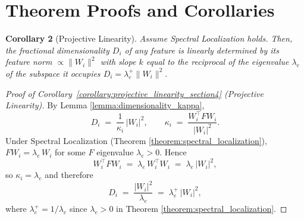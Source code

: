 \documentclass{article}
\theoremstyle{plain}
\numberwithin{equation}{section}
\theoremstyle{definition}
\theoremstyle{remark}
\begin{document}
\section{Theorem Proofs and Corollaries}
\label{sec:theorems_proofs_corollaries}

\begin{lemmaproofbox}
\textbf{Corollary 2} (Projective Linearity). \textit{Assume Spectral Localization holds. Then, the fractional dimensionality $D_i$ of any feature is linearly determined by its feature norm $\propto \|W_i\|^2$ with slope $k$ equal to the reciprocal of the eigenvalue $\lambda_e$ of the subspace it occupies $D_i = \lambda_e^+ \|W_i\|^2$}.
\begin{proof}[Proof of Corollary~\ref{corollary:projective_linearity_section4} (Projective Linearity)]\label{corollary:projective_linearity}
By Lemma \ref{lemma:dimensionality_kappa},
\[
D_i \;=\; \frac{1}{\kappa_i}\,\lvert W_i\rvert^2,
\qquad
\kappa_i \;=\; \frac{W_i^\top F W_i}{\lvert W_i\rvert^2}.
\]
Under Spectral Localization (Theorem \ref{theorem:spectral_localization}), $F W_i=\lambda_e\,W_i$ for some $F$ eigenvalue $\lambda_e>0$. Hence
\[
W_i^\top F W_i \;=\; \lambda_e\,W_i^\top W_i \;=\; \lambda_e\,\lvert W_i\rvert^2,
\]
so $\kappa_i=\lambda_e$ and therefore
\[
D_i \;=\; \frac{\lvert W_i\rvert^2}{\lambda_e} \;=\; \lambda_e^{+}\,\lvert W_i\rvert^2,
\]
where $\lambda_e^+=1/\lambda_e$ since $\lambda_e>0$ in Theorem \ref{theorem:spectral_localization}. 
\end{proof}
\end{lemmaproofbox}
\end{document}
